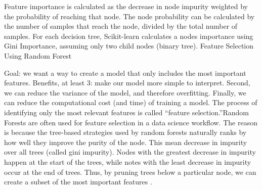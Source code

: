\documentclass[preprint,12pt]{elsarticle}
\begin{document}
Feature importance is calculated as the decrease in node impurity weighted by the probability of reaching that node. The node probability can be calculated by the number of samples that reach the node, divided by the total number of samples. For each decision tree, Scikit-learn calculates a nodes importance using Gini Importance, assuming only two child nodes (binary tree).
Feature Selection Using Random Forest

Goal: we want a way to create a model that only includes the most important features. Benefits, at least 3:
make our model more simple to interpret. Second, we can reduce the variance of the model, and therefore overfitting. Finally, we can reduce the computational cost (and time) of training a model. The process of identifying only the most relevant features is called “feature selection.”Random Forests are often used for feature selection in a data science workflow. The reason is because the tree-based strategies used by random forests naturally ranks by how well they improve the purity of the node. This mean decrease in impurity over all trees (called gini impurity). Nodes with the greatest decrease in impurity happen at the start of the trees, while notes with the least decrease in impurity occur at the end of trees. Thus, by pruning trees below a particular node, we can create a subset of the most important features \cite{breiman2001random}.

\end{document}
